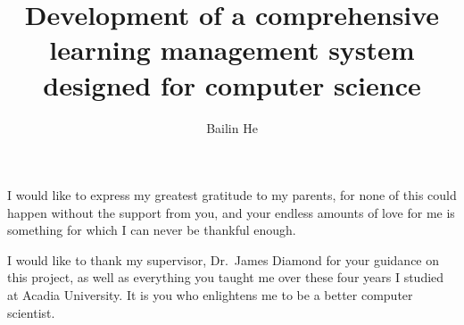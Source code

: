 

\title{Development of a comprehensive learning management system designed for
computer science}

\author{Bailin He}







\firstThreePages


\Acknowledgments
I would like to express my greatest gratitude to my parents,
for none of this could happen without the
support from you, and your endless amounts of love for me is something for which
I can never be thankful enough.

\medskip

I would like to thank my supervisor, Dr.~James Diamond for your
guidance on this project, as well as everything you taught me over these four
years I studied at Acadia University.
It is you who enlightens me to be a better computer scientist.

